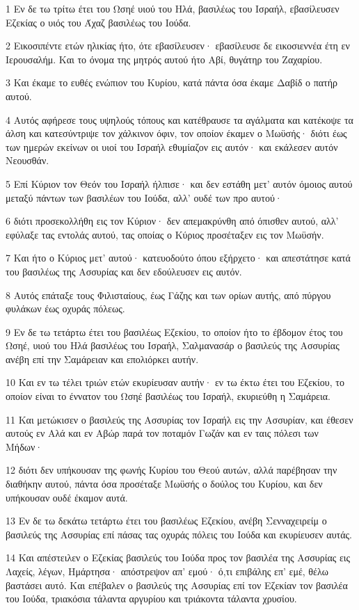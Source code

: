 \par 1 Εν δε τω τρίτω έτει του Ωσηέ υιού του Ηλά, βασιλέως του Ισραήλ, εβασίλευσεν Εζεκίας ο υιός του Άχαζ βασιλέως του Ιούδα.
\par 2 Εικοσιπέντε ετών ηλικίας ήτο, ότε εβασίλευσεν· εβασίλευσε δε εικοσιεννέα έτη εν Ιερουσαλήμ. Και το όνομα της μητρός αυτού ήτο Αβί, θυγάτηρ του Ζαχαρίου.
\par 3 Και έκαμε το ευθές ενώπιον του Κυρίου, κατά πάντα όσα έκαμε Δαβίδ ο πατήρ αυτού.
\par 4 Αυτός αφήρεσε τους υψηλούς τόπους και κατέθραυσε τα αγάλματα και κατέκοψε τα άλση και κατεσύντριψε τον χάλκινον όφιν, τον οποίον έκαμεν ο Μωϋσής· διότι έως των ημερών εκείνων οι υιοί του Ισραήλ εθυμίαζον εις αυτόν· και εκάλεσεν αυτόν Νεουσθάν.
\par 5 Επί Κύριον τον Θεόν του Ισραήλ ήλπισε· και δεν εστάθη μετ' αυτόν όμοιος αυτού μεταξύ πάντων των βασιλέων του Ιούδα, αλλ' ουδέ των προ αυτού·
\par 6 διότι προσεκολλήθη εις τον Κύριον· δεν απεμακρύνθη από όπισθεν αυτού, αλλ' εφύλαξε τας εντολάς αυτού, τας οποίας ο Κύριος προσέταξεν εις τον Μωϋσήν.
\par 7 Και ήτο ο Κύριος μετ' αυτού· κατευοδούτο όπου εξήρχετο· και απεστάτησε κατά του βασιλέως της Ασσυρίας και δεν εδούλευσεν εις αυτόν.
\par 8 Αυτός επάταξε τους Φιλισταίους, έως Γάζης και των ορίων αυτής, από πύργου φυλάκων έως οχυράς πόλεως.
\par 9 Εν δε τω τετάρτω έτει του βασιλέως Εζεκίου, το οποίον ήτο το έβδομον έτος του Ωσηέ, υιού του Ηλά βασιλέως του Ισραήλ, Σαλμανασάρ ο βασιλεύς της Ασσυρίας ανέβη επί την Σαμάρειαν και επολιόρκει αυτήν.
\par 10 Και εν τω τέλει τριών ετών εκυρίευσαν αυτήν· εν τω έκτω έτει του Εζεκίου, το οποίον είναι το έννατον του Ωσηέ βασιλέως του Ισραήλ, εκυριεύθη η Σαμάρεια.
\par 11 Και μετώκισεν ο βασιλεύς της Ασσυρίας τον Ισραήλ εις την Ασσυρίαν, και έθεσεν αυτούς εν Αλά και εν Αβώρ παρά τον ποταμόν Γωζάν και εν ταις πόλεσι των Μήδων·
\par 12 διότι δεν υπήκουσαν της φωνής Κυρίου του Θεού αυτών, αλλά παρέβησαν την διαθήκην αυτού, πάντα όσα προσέταξε Μωϋσής ο δούλος του Κυρίου, και δεν υπήκουσαν ουδέ έκαμον αυτά.
\par 13 Εν δε τω δεκάτω τετάρτω έτει του βασιλέως Εζεκίου, ανέβη Σενναχειρείμ ο βασιλεύς της Ασσυρίας επί πάσας τας οχυράς πόλεις του Ιούδα και εκυρίευσεν αυτάς.
\par 14 Και απέστειλεν ο Εζεκίας βασιλεύς του Ιούδα προς τον βασιλέα της Ασσυρίας εις Λαχείς, λέγων, Ημάρτησα· απόστρεψον απ' εμού· ό,τι επιβάλης επ' εμέ, θέλω βαστάσει αυτό. Και επέβαλεν ο βασιλεύς της Ασσυρίας επί τον Εζεκίαν τον βασιλέα του Ιούδα, τριακόσια τάλαντα αργυρίου και τριάκοντα τάλαντα χρυσίου.
